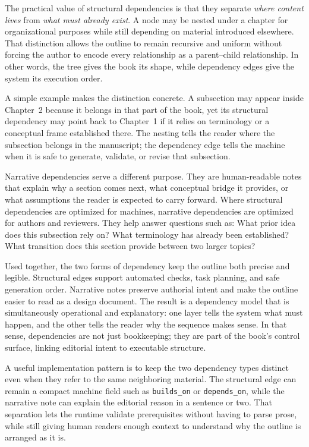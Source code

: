 \documentclass[11pt]{article}
\begin{document}
The practical value of structural dependencies is that they separate \emph{where content lives} from \emph{what must already exist}. A node may be nested under a chapter for organizational purposes while still depending on material introduced elsewhere. That distinction allows the outline to remain recursive and uniform without forcing the author to encode every relationship as a parent--child relationship. In other words, the tree gives the book its shape, while dependency edges give the system its execution order.

A simple example makes the distinction concrete. A subsection may appear inside Chapter~2 because it belongs in that part of the book, yet its structural dependency may point back to Chapter~1 if it relies on terminology or a conceptual frame established there. The nesting tells the reader where the subsection belongs in the manuscript; the dependency edge tells the machine when it is safe to generate, validate, or revise that subsection.

Narrative dependencies serve a different purpose. They are human-readable notes that explain why a section comes next, what conceptual bridge it provides, or what assumptions the reader is expected to carry forward. Where structural dependencies are optimized for machines, narrative dependencies are optimized for authors and reviewers. They help answer questions such as: What prior idea does this subsection rely on? What terminology has already been established? What transition does this section provide between two larger topics?

Used together, the two forms of dependency keep the outline both precise and legible. Structural edges support automated checks, task planning, and safe generation order. Narrative notes preserve authorial intent and make the outline easier to read as a design document. The result is a dependency model that is simultaneously operational and explanatory: one layer tells the system what must happen, and the other tells the reader why the sequence makes sense. In that sense, dependencies are not just bookkeeping; they are part of the book's control surface, linking editorial intent to executable structure.

A useful implementation pattern is to keep the two dependency types distinct even when they refer to the same neighboring material. The structural edge can remain a compact machine field such as \texttt{builds\_on} or \texttt{depends\_on}, while the narrative note can explain the editorial reason in a sentence or two. That separation lets the runtime validate prerequisites without having to parse prose, while still giving human readers enough context to understand why the outline is arranged as it is.
\end{document}
